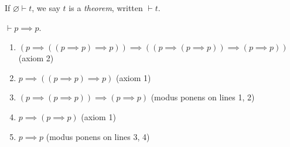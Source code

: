 \begin{definition}
    If \( \varnothing \vdash t \), we say \( t \) is a \emph{theorem}, written \( \vdash t \).
\end{definition}
\begin{example}
    \( \vdash p \implies p \).
    \begin{enumerate}[1.]
        \item \( (p \implies ((p \implies p) \implies p)) \implies ((p \implies (p \implies p)) \implies (p \implies p)) \) (axiom 2)
        \item \( p \implies ((p \implies p) \implies p) \) (axiom 1)
        \item \( (p \implies (p \implies p)) \implies (p \implies p) \) (modus ponens on lines 1, 2)
        \item \( p \implies (p \implies p) \) (axiom 1)
        \item \( p \implies p \) (modus ponens on lines 3, 4)
    \end{enumerate}
\end{example}

